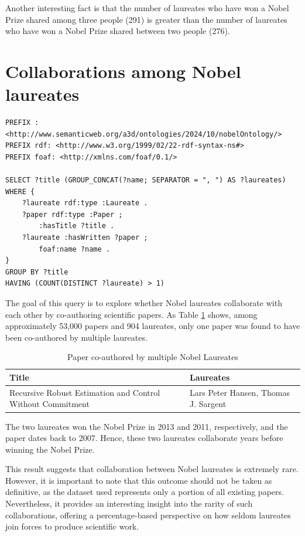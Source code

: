 \documentclass{article}
\begin{document}
Another interesting fact is that the number of laureates who have won a Nobel Prize shared among three people (291)
is greater than the number of laureates who have won a Nobel Prize shared between two people (276).

\newpage

\section{Collaborations among Nobel laureates}

\begin{lstlisting}
PREFIX : <http://www.semanticweb.org/a3d/ontologies/2024/10/nobelOntology/>
PREFIX rdf: <http://www.w3.org/1999/02/22-rdf-syntax-ns#>
PREFIX foaf: <http://xmlns.com/foaf/0.1/>

SELECT ?title (GROUP_CONCAT(?name; SEPARATOR = ", ") AS ?laureates) WHERE {
    ?laureate rdf:type :Laureate .
    ?paper rdf:type :Paper ;
        :hasTitle ?title .
    ?laureate :hasWritten ?paper ;
        foaf:name ?name .
}
GROUP BY ?title
HAVING (COUNT(DISTINCT ?laureate) > 1)
\end{lstlisting}

\vspace{1em}

The goal of this query is to explore whether Nobel laureates collaborate with each other by co-authoring
scientific papers. As Table \ref{tab:laureates_collaboration} shows, among approximately 53,000 papers
and 904 laureates, only one paper was found to have been co-authored by multiple laureates.

\begin{table}[H]
	\caption{Paper co-authored by multiple Nobel Laureates}
	\centering
	\begin{tabular}{|l|l|}
		\hline
		\textbf{Title}                                             & \textbf{Laureates}                   \\ \hline
		Recursive Robust Estimation and Control Without Commitment & Lars Peter Hansen, Thomas J. Sargent \\ \hline
	\end{tabular}
	\label{tab:laureates_collaboration}
\end{table}

The two laureates won the Nobel Prize in 2013 and 2011, respectively, and the paper dates back to 2007.
Hence, these two laureates collaborate years before winning the Nobel Prize.

This result suggests that collaboration between Nobel laureates is extremely rare. However, it is important to
note that this outcome should not be taken as definitive, as the dataset used represents only a portion of all
existing papers. Nevertheless, it provides an interesting insight into the rarity of such
collaborations, offering a percentage-based perspective on how seldom laureates join forces to produce scientific
work.
\end{document}
